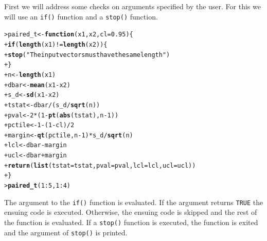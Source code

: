\documentclass[12pt,oneside]{book}\usepackage[]{graphicx}\usepackage[]{color}
\makeatletter
\newcommand{\hlnum}[1]{\textcolor[rgb]{0.686,0.059,0.569}{#1}}%
\newcommand{\hlstr}[1]{\textcolor[rgb]{0.192,0.494,0.8}{#1}}%
\newcommand{\hlopt}[1]{\textcolor[rgb]{0,0,0}{#1}}%
\newcommand{\hlstd}[1]{\textcolor[rgb]{0.345,0.345,0.345}{#1}}%
\newcommand{\hlkwa}[1]{\textcolor[rgb]{0.161,0.373,0.58}{\textbf{#1}}}%
\newcommand{\hlkwb}[1]{\textcolor[rgb]{0.69,0.353,0.396}{#1}}%
\newcommand{\hlkwc}[1]{\textcolor[rgb]{0.333,0.667,0.333}{#1}}%
\newcommand{\hlkwd}[1]{\textcolor[rgb]{0.737,0.353,0.396}{\textbf{#1}}}%
\newenvironment{kframe}{%
 \def\at@end@of@kframe{}%
 \ifinner\ifhmode%
  \def\at@end@of@kframe{\end{minipage}}%
  \begin{minipage}{\columnwidth}%
 \fi\fi%
 \def\FrameCommand##1{\hskip\@totalleftmargin \hskip-\fboxsep
 \colorbox{shadecolor}{##1}\hskip-\fboxsep
     \hskip-\linewidth \hskip-\@totalleftmargin \hskip\columnwidth}%
 \MakeFramed {\advance\hsize-\width
   \@totalleftmargin\z@ \linewidth\hsize
   \@setminipage}}%
 {\par\unskip\endMakeFramed%
 \at@end@of@kframe}
\newenvironment{knitrout}{}{} %
\makeatother
\begin{document}
First we will address some checks on arguments specified by the user. For this we will use an \verb+if()+ function and a \verb+stop()+ function. 
\begin{knitrout}
\color{fgcolor}\begin{kframe}
\begin{alltt}
\hlstd{> }\hlstd{paired_t} \hlkwb{<-} \hlkwa{function}\hlstd{(}\hlkwc{x1}\hlstd{,} \hlkwc{x2}\hlstd{,} \hlkwc{cl} \hlstd{=} \hlnum{0.95}\hlstd{) \{}
\hlstd{+ }    \hlkwa{if} \hlstd{(}\hlkwd{length}\hlstd{(x1)} \hlopt{!=} \hlkwd{length}\hlstd{(x2)) \{}
\hlstd{+ }        \hlkwd{stop}\hlstd{(}\hlstr{"The input vectors  must have the same length"}\hlstd{)}
\hlstd{+ }    \hlstd{\}}
\hlstd{+ }    \hlstd{n} \hlkwb{<-} \hlkwd{length}\hlstd{(x1)}
\hlstd{+ }    \hlstd{dbar} \hlkwb{<-} \hlkwd{mean}\hlstd{(x1} \hlopt{-} \hlstd{x2)}
\hlstd{+ }    \hlstd{s_d} \hlkwb{<-} \hlkwd{sd}\hlstd{(x1} \hlopt{-} \hlstd{x2)}
\hlstd{+ }    \hlstd{tstat} \hlkwb{<-} \hlstd{dbar}\hlopt{/}\hlstd{(s_d}\hlopt{/}\hlkwd{sqrt}\hlstd{(n))}
\hlstd{+ }    \hlstd{pval} \hlkwb{<-} \hlnum{2} \hlopt{*} \hlstd{(}\hlnum{1} \hlopt{-} \hlkwd{pt}\hlstd{(}\hlkwd{abs}\hlstd{(tstat), n} \hlopt{-} \hlnum{1}\hlstd{))}
\hlstd{+ }    \hlstd{pctile} \hlkwb{<-} \hlnum{1} \hlopt{-} \hlstd{(}\hlnum{1} \hlopt{-} \hlstd{cl)}\hlopt{/}\hlnum{2}
\hlstd{+ }    \hlstd{margin} \hlkwb{<-} \hlkwd{qt}\hlstd{(pctile, n} \hlopt{-} \hlnum{1}\hlstd{)} \hlopt{*} \hlstd{s_d}\hlopt{/}\hlkwd{sqrt}\hlstd{(n)}
\hlstd{+ }    \hlstd{lcl} \hlkwb{<-} \hlstd{dbar} \hlopt{-} \hlstd{margin}
\hlstd{+ }    \hlstd{ucl} \hlkwb{<-} \hlstd{dbar} \hlopt{+} \hlstd{margin}
\hlstd{+ }    \hlkwd{return}\hlstd{(}\hlkwd{list}\hlstd{(}\hlkwc{tstat} \hlstd{= tstat,} \hlkwc{pval} \hlstd{= pval,} \hlkwc{lcl} \hlstd{= lcl,} \hlkwc{ucl} \hlstd{= ucl))}
\hlstd{+ }\hlstd{\}}
\hlstd{> }\hlkwd{paired_t}\hlstd{(}\hlnum{1}\hlopt{:}\hlnum{5}\hlstd{,} \hlnum{1}\hlopt{:}\hlnum{4}\hlstd{)}
\end{alltt}


{\ttfamily\noindent\bfseries\color{errorcolor}{Error in paired\_t(1:5, 1:4): The input vectors\ \ must have the same length}}\end{kframe}
\end{knitrout}
The argument to the \verb+if()+ function is evaluated. If the argument returns \verb+TRUE+ the ensuing code is executed. Otherwise, the ensuing code is skipped and the rest of the function is evaluated. If a \verb+stop()+ function is executed, the function is exited and the argument of \verb+stop()+ is printed. 
\end{document}
